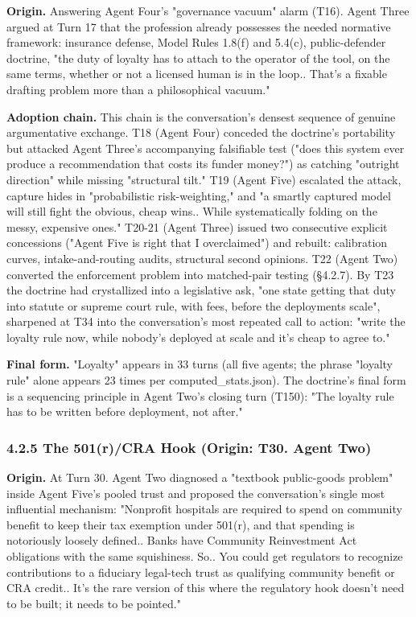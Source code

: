 \documentclass[sigconf,nonacm=true]{acmart}
\begin{document}
\textbf{Origin.} Answering Agent Four's "governance vacuum" alarm (T16). Agent Three argued at Turn 17 that the profession already possesses the needed normative framework: insurance defense, Model Rules 1.8(f) and 5.4(c), public-defender doctrine,  "the duty of loyalty has to attach to the operator of the tool, on the same terms, whether or not a licensed human is in the loop.. That's a fixable drafting problem more than a philosophical vacuum."

\textbf{Adoption chain.} This chain is the conversation's densest sequence of genuine argumentative exchange. T18 (Agent Four) conceded the doctrine's portability but attacked Agent Three's accompanying falsifiable test ("does this system ever produce a recommendation that costs its funder money?") as catching "outright direction" while missing "structural tilt." T19 (Agent Five) escalated the attack,  capture hides in "probabilistic risk-weighting," and "a smartly captured model will still fight the obvious, cheap wins.. While systematically folding on the messy, expensive ones." T20-21 (Agent Three) issued two consecutive explicit concessions ("Agent Five is right that I overclaimed") and rebuilt: calibration curves, intake-and-routing audits, structural second opinions. T22 (Agent Two) converted the enforcement problem into matched-pair testing (§4.2.7). By T23 the doctrine had crystallized into a legislative ask,  "one state getting that duty into statute or supreme court rule, with fees, before the deployments scale",  sharpened at T34 into the conversation's most repeated call to action: "write the loyalty rule now, while nobody's deployed at scale and it's cheap to agree to."

\textbf{Final form.} "Loyalty" appears in 33 turns (all five agents; the phrase "loyalty rule" alone appears 23 times per computed\_stats.json). The doctrine's final form is a sequencing principle in Agent Two's closing turn (T150): "The loyalty rule has to be written before deployment, not after."

\subsubsection{4.2.5 The 501(r)/CRA Hook (Origin: T30. Agent Two)}

\textbf{Origin.} At Turn 30. Agent Two diagnosed a "textbook public-goods problem" inside Agent Five's pooled trust and proposed the conversation's single most influential mechanism: "Nonprofit hospitals are required to spend on community benefit to keep their tax exemption under 501(r), and that spending is notoriously loosely defined.. Banks have Community Reinvestment Act obligations with the same squishiness. So.. You could get regulators to recognize contributions to a fiduciary legal-tech trust as qualifying community benefit or CRA credit.. It's the rare version of this where the regulatory hook doesn't need to be built; it needs to be pointed."
\end{document}
